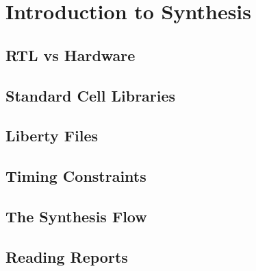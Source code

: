 \chapter{Introduction to Synthesis}

\section{RTL vs Hardware}

\section{Standard Cell Libraries}

\section{Liberty Files}

\section{Timing Constraints}

\section{The Synthesis Flow}

\section{Reading Reports}
